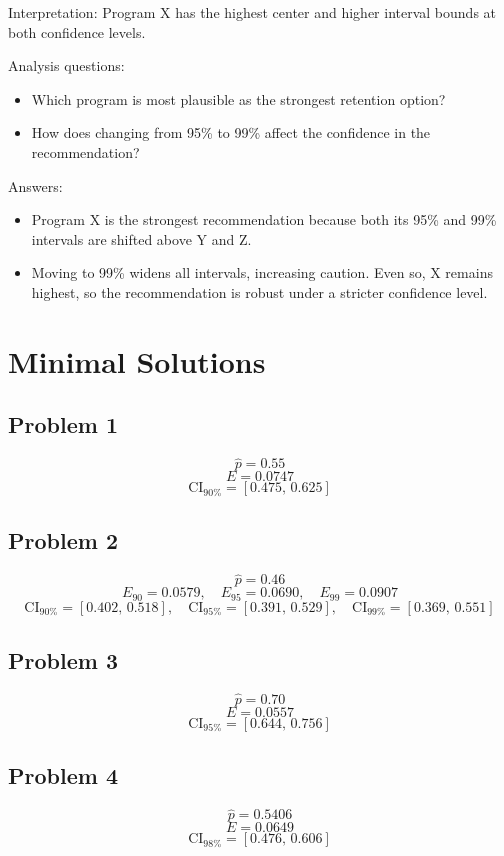 	Interpretation: Program X has the highest center and higher interval bounds at both confidence levels.
	
	Analysis questions:
	\begin{itemize}
		\item Which program is most plausible as the strongest retention option?
		\item How does changing from 95\% to 99\% affect the confidence in the recommendation?
	\end{itemize}
	
	Answers:
	\begin{itemize}
		\item Program X is the strongest recommendation because both its 95\% and 99\% intervals are shifted above Y and Z.
		\item Moving to 99\% widens all intervals, increasing caution. Even so, X remains highest, so the recommendation is robust under a stricter confidence level.
	\end{itemize}
	
	\section{Minimal Solutions}
	\subsection*{Problem 1}
	\[
	\hat p = 0.55
	\]
	\[
	E = 0.0747
	\]
	\[
	\text{CI}_{90\%}=[0.475,\,0.625]
	\]
	
	\subsection*{Problem 2}
	\[
	\hat p = 0.46
	\]
	\[
	E_{90}=0.0579,\quad E_{95}=0.0690,\quad E_{99}=0.0907
	\]
	\[
	\text{CI}_{90\%}=[0.402,\,0.518],\quad \text{CI}_{95\%}=[0.391,\,0.529],\quad \text{CI}_{99\%}=[0.369,\,0.551]
	\]
	
	\subsection*{Problem 3}
	\[
	\hat p = 0.70
	\]
	\[
	E = 0.0557
	\]
	\[
	\text{CI}_{95\%}=[0.644,\,0.756]
	\]
	
	\subsection*{Problem 4}
	\[
	\hat p = 0.5406
	\]
	\[
	E = 0.0649
	\]
	\[
	\text{CI}_{98\%}=[0.476,\,0.606]
	\]
	
